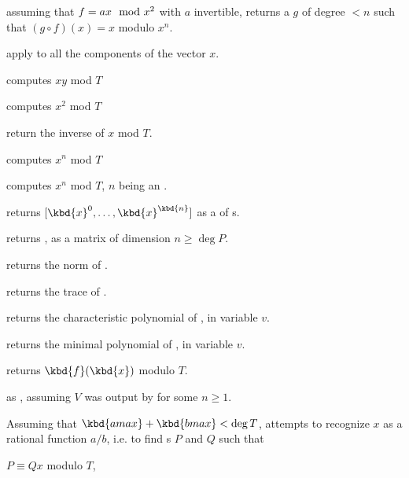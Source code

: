  assuming that $f = a\*x \mod{x^2}$
with $a$ invertible, returns a  $g$ of degree $< n$ such that $(g
\circ f)(x) = x$ modulo $x^n$.


 apply 
to all the components of the vector $x$.


 computes $xy$ mod $T$

 computes $x^2$ mod $T$

 return the inverse of $x$ mod $T$.

 computes $x^n$ mod $T$

 computes $x^n$ mod $T$,
$n$ being an .

 returns $[\kbd{x}^0,
\dots, \kbd{x}^\kbd{n}]$ as a  of s.

 returns
, as a matrix of dimension $n \geq \deg P$.

 returns the norm of .

 returns the trace of .

 returns the characteristic
polynomial of , in variable $v$.

 returns the minimal
polynomial of , in variable $v$.

 returns $\kbd{f}(\kbd{x})$ modulo
$T$.

 as ,
assuming $V$ was output by  for some $n\geq 1$.

Assuming that $\kbd{amax}+\kbd{bmax}<\deg T$, attempts to recognize $x$ as a
rational function $a/b$, i.e. to find s $P$ and $Q$ such that

\item $P \equiv Q x$ modulo $T$,

